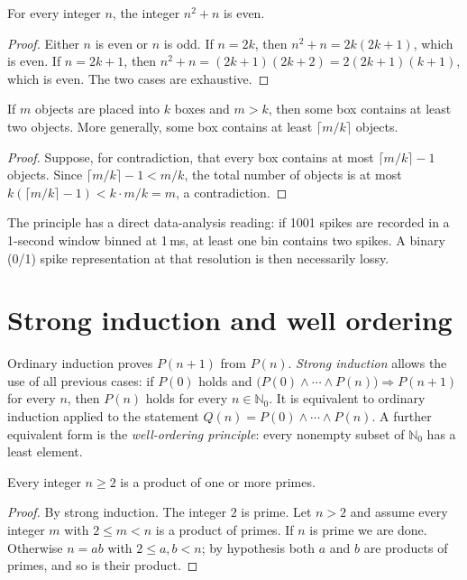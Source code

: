 \begin{proposition}
For every integer $n$, the integer $n^2+n$ is even.
\end{proposition}
\begin{proof}
Either $n$ is even or $n$ is odd. If $n=2k$, then $n^2+n=2k(2k+1)$, which is even. If $n=2k+1$, then $n^2+n=(2k+1)(2k+2)=2(2k+1)(k+1)$, which is even. The two cases are exhaustive.
\end{proof}

\begin{theorem}
If $m$ objects are placed into $k$ boxes and $m>k$, then some box contains at least two objects. More generally, some box contains at least $\lceil m/k\rceil$ objects.
\end{theorem}
\begin{proof}
Suppose, for contradiction, that every box contains at most $\lceil m/k\rceil-1$ objects. Since $\lceil m/k\rceil-1<m/k$, the total number of objects is at most $k(\lceil m/k\rceil-1)<k\cdot m/k=m$, a contradiction.
\end{proof}
The principle has a direct data-analysis reading: if 1001 spikes are recorded in a 1-second window binned at 1\,ms, at least one bin contains two spikes. A binary (0/1) spike representation at that resolution is then necessarily lossy.

\section{Strong induction and well ordering}
Ordinary induction proves $P(n+1)$ from $P(n)$. \emph{Strong induction} allows the use of all previous cases: if $P(0)$ holds and $\bigl(P(0)\land\cdots\land P(n)\bigr)\Rightarrow P(n+1)$ for every $n$, then $P(n)$ holds for every $n\in\mathbb N_0$. It is equivalent to ordinary induction applied to the statement $Q(n)=P(0)\land\cdots\land P(n)$. A further equivalent form is the \emph{well-ordering principle}: every nonempty subset of $\mathbb N_0$ has a least element.

\begin{proposition}
Every integer $n\ge2$ is a product of one or more primes.
\end{proposition}
\begin{proof}
By strong induction. The integer $2$ is prime. Let $n>2$ and assume every integer $m$ with $2\le m<n$ is a product of primes. If $n$ is prime we are done. Otherwise $n=ab$ with $2\le a,b<n$; by hypothesis both $a$ and $b$ are products of primes, and so is their product.
\end{proof}

